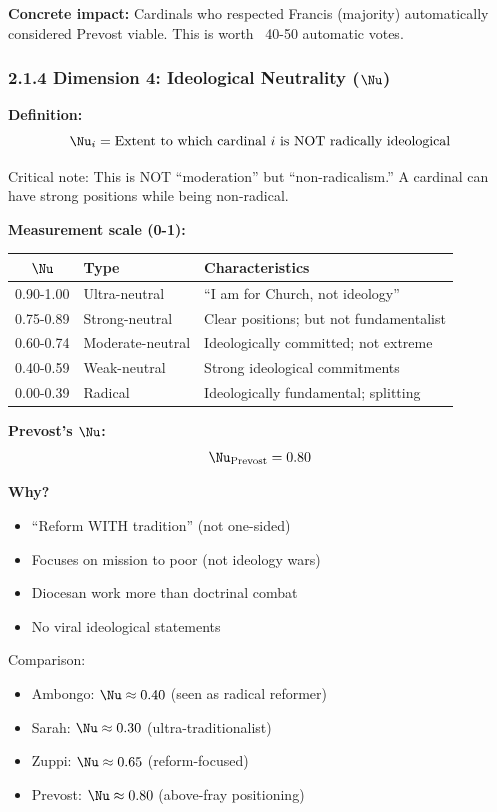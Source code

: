 \textbf{Concrete impact:} Cardinals who respected Francis (majority) automatically considered Prevost viable. This is worth ~40-50 automatic votes.

\subsubsection{2.1.4 Dimension 4: Ideological Neutrality ($\Nu$)}

\textbf{Definition:}
$$\Nu_i = \text{Extent to which cardinal } i \text{ is NOT radically ideological}$$

Critical note: This is NOT ``moderation'' but ``non-radicalism.'' A cardinal can have strong positions while being non-radical.

\textbf{Measurement scale (0-1):}

\begin{table}[h]
\centering
\begin{tabular}{|c|l|l|}
\hline
$\Nu$ & \textbf{Type} & \textbf{Characteristics} \\
\hline
0.90-1.00 & Ultra-neutral & ``I am for Church, not ideology'' \\
0.75-0.89 & Strong-neutral & Clear positions; but not fundamentalist \\
0.60-0.74 & Moderate-neutral & Ideologically committed; not extreme \\
0.40-0.59 & Weak-neutral & Strong ideological commitments \\
0.00-0.39 & Radical & Ideologically fundamental; splitting \\
\hline
\end{tabular}
\end{table}

\textbf{Prevost's $\Nu$:}
$$\Nu_{\text{Prevost}} = 0.80$$

\textbf{Why?}
\begin{itemize}
\item ``Reform WITH tradition'' (not one-sided)
\item Focuses on mission to poor (not ideology wars)
\item Diocesan work more than doctrinal combat
\item No viral ideological statements
\end{itemize}

Comparison:
\begin{itemize}
\item Ambongo: $\Nu \approx 0.40$ (seen as radical reformer)
\item Sarah: $\Nu \approx 0.30$ (ultra-traditionalist)
\item Zuppi: $\Nu \approx 0.65$ (reform-focused)
\item Prevost: $\Nu \approx 0.80$ (above-fray positioning)
\end{itemize}

